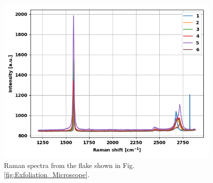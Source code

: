 \documentclass[12pt,a4paper]{article}
\begin{document}
\begin{figure}
\centering
\includegraphics[scale=0.5]{Bilder/Exfoliation/2_mono_bi_tri_flake_all.PNG}
\caption{Raman spectra from the flake shown in Fig. \ref{fig:Exfoliation_Microscope}.}
\label{fig:Exfoliation_Spectra}
\end{figure}
\end{document}
